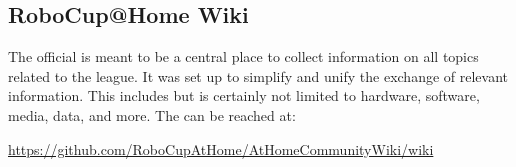 \subsection{RoboCup@Home Wiki}
\label{sec:introduction:wiki}
The official \AtHome{} \WIKI{} is meant to be a central place to collect information on all topics related to the \AtHome league. It was set up to simplify and unify the exchange of relevant information.
This includes but is certainly not limited to hardware, software, media, data, and more.
The \WIKI{} can be reached at:
\begin{center}
{\small\url{https://github.com/RoboCupAtHome/AtHomeCommunityWiki/wiki}}
\end{center}

